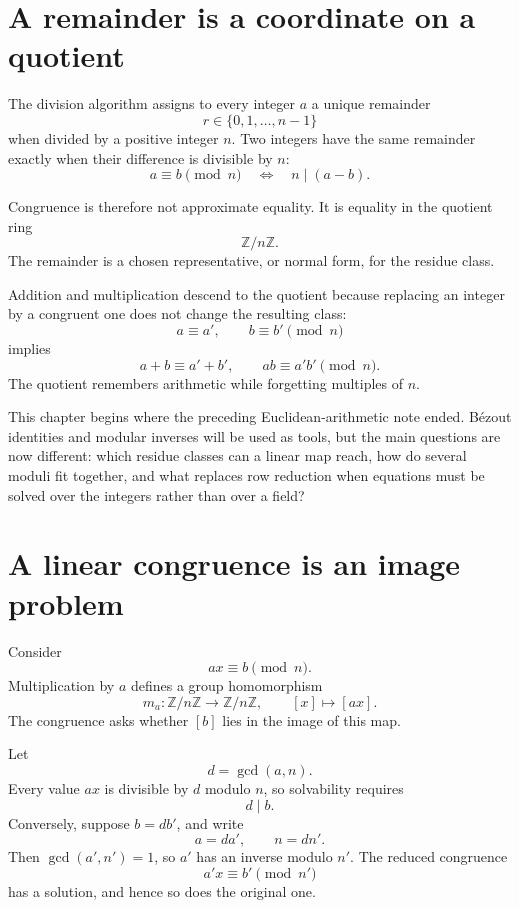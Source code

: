 
\section{A remainder is a coordinate on a quotient}

The division algorithm assigns to every integer \(a\) a unique remainder
\[
  r\in\{0,1,\ldots,n-1\}
\]
when divided by a positive integer \(n\).  Two integers have the same remainder exactly when their difference is divisible by \(n\):
\[
  a\equiv b\pmod n
  \quad\Longleftrightarrow\quad
  n\mid(a-b).
\]

Congruence is therefore not approximate equality.  It is equality in the quotient ring
\[
  \mathbb Z/n\mathbb Z.
\]
The remainder is a chosen representative, or normal form, for the residue class.

Addition and multiplication descend to the quotient because replacing an integer by a congruent one does not change the resulting class:
\[
  a\equiv a',
  \qquad
  b\equiv b'\pmod n
\]
implies
\[
  a+b\equiv a'+b',
  \qquad
  ab\equiv a'b'\pmod n.
\]
The quotient remembers arithmetic while forgetting multiples of \(n\).

This chapter begins where the preceding Euclidean-arithmetic note ended.  Bézout identities and modular inverses will be used as tools, but the main questions are now different: which residue classes can a linear map reach, how do several moduli fit together, and what replaces row reduction when equations must be solved over the integers rather than over a field?

\section{A linear congruence is an image problem}

Consider
\[
  ax\equiv b\pmod n.
\]
Multiplication by \(a\) defines a group homomorphism
\[
  m_a:\mathbb Z/n\mathbb Z
  \longrightarrow
  \mathbb Z/n\mathbb Z,
  \qquad
  [x]\longmapsto[ax].
\]
The congruence asks whether \([b]\) lies in the image of this map.

Let
\[
  d=\gcd(a,n).
\]
Every value \(ax\) is divisible by \(d\) modulo \(n\), so solvability requires
\[
  d\mid b.
\]
Conversely, suppose \(b=db'\), and write
\[
  a=da',
  \qquad
  n=dn'.
\]
Then \(\gcd(a',n')=1\), so \(a'\) has an inverse modulo \(n'\).  The reduced congruence
\[
  a'x\equiv b'\pmod{n'}
\]
has a solution, and hence so does the original one.

